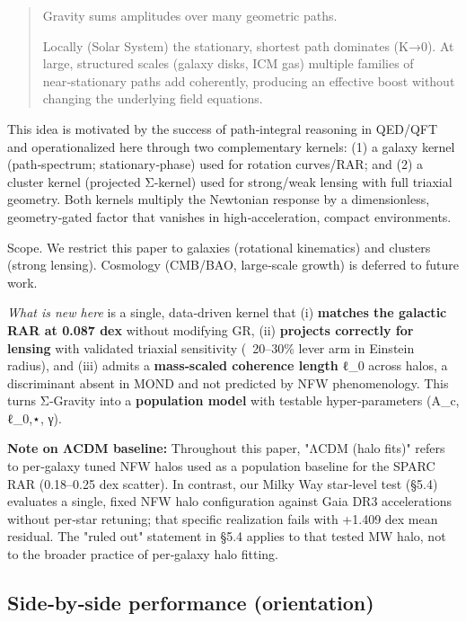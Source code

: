 \documentclass[11pt,a4paper]{article}
\begin{document}
\begin{quote}
Gravity sums amplitudes over many geometric paths.

Locally (Solar System) the stationary, shortest path dominates (K→0). At large, structured scales (galaxy disks, ICM gas) multiple families of near‑stationary paths add coherently, producing an effective boost without changing the underlying field equations.

\end{quote}


This idea is motivated by the success of path‑integral reasoning in QED/QFT and operationalized here through two complementary kernels: (1) a galaxy kernel (path‑spectrum; stationary‑phase) used for rotation curves/RAR; and (2) a cluster kernel (projected Σ‑kernel) used for strong/weak lensing with full triaxial geometry. Both kernels multiply the Newtonian response by a dimensionless, geometry‑gated factor that vanishes in high‑acceleration, compact environments.


Scope. We restrict this paper to galaxies (rotational kinematics) and clusters (strong lensing). Cosmology (CMB/BAO, large‑scale growth) is deferred to future work.


\textit{What is new here} is a single, data‑driven kernel that (i) \textbf{matches the galactic RAR at 0.087 dex} without modifying GR, (ii) \textbf{projects correctly for lensing} with validated triaxial sensitivity (~20–30\% lever arm in Einstein radius), and (iii) admits a \textbf{mass‑scaled coherence length} ℓ\_0 across halos, a discriminant absent in MOND and not predicted by NFW phenomenology. This turns Σ‑Gravity into a \textbf{population model} with testable hyper‑parameters (A\_c, ℓ\_{0,⋆}, γ).


\textbf{Note on ΛCDM baseline:} Throughout this paper, "ΛCDM (halo fits)" refers to per‑galaxy tuned NFW halos used as a population baseline for the SPARC RAR (0.18–0.25 dex scatter). In contrast, our Milky Way star‑level test (§5.4) evaluates a single, fixed NFW halo configuration against Gaia DR3 accelerations without per‑star retuning; that specific realization fails with +1.409 dex mean residual. The "ruled out" statement in §5.4 applies to that tested MW halo, not to the broader practice of per‑galaxy halo fitting.


\subsection{Side‑by‑side performance (orientation)}
\end{document}

